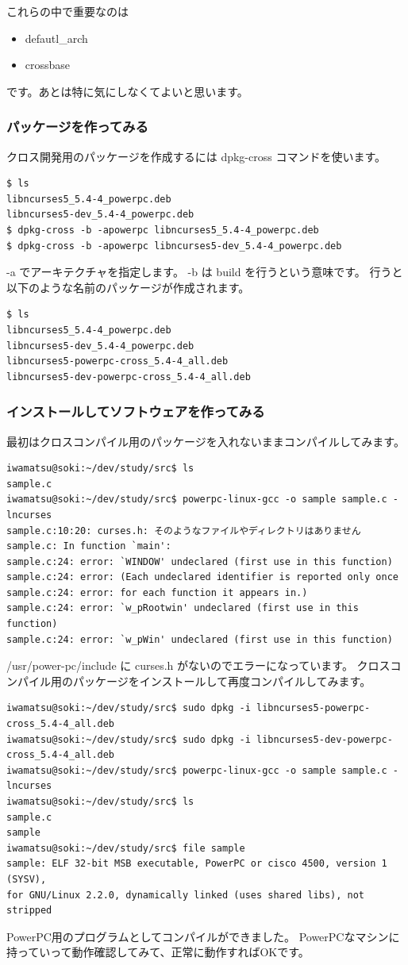 \documentclass[mingoth,a4paper]{jsarticle}
\begin{document}
これらの中で重要なのは
\begin{itemize}
 \item defautl\_arch
 \item crossbase
\end{itemize}
です。あとは特に気にしなくてよいと思います。

\subsubsection{パッケージを作ってみる}
クロス開発用のパッケージを作成するには dpkg-cross コマンドを使います。

\begin{verbatim}
$ ls 
libncurses5_5.4-4_powerpc.deb
libncurses5-dev_5.4-4_powerpc.deb
$ dpkg-cross -b -apowerpc libncurses5_5.4-4_powerpc.deb
$ dpkg-cross -b -apowerpc libncurses5-dev_5.4-4_powerpc.deb
\end{verbatim}
-a でアーキテクチャを指定します。
-b は build を行うという意味です。
行うと以下のような名前のパッケージが作成されます。
\begin{verbatim}
$ ls
libncurses5_5.4-4_powerpc.deb
libncurses5-dev_5.4-4_powerpc.deb
libncurses5-powerpc-cross_5.4-4_all.deb
libncurses5-dev-powerpc-cross_5.4-4_all.deb
\end{verbatim}

\subsubsection{インストールしてソフトウェアを作ってみる}

最初はクロスコンパイル用のパッケージを入れないままコンパイルしてみます。
\begin{verbatim}
iwamatsu@soki:~/dev/study/src$ ls
sample.c
iwamatsu@soki:~/dev/study/src$ powerpc-linux-gcc -o sample sample.c -lncurses
sample.c:10:20: curses.h: そのようなファイルやディレクトリはありません
sample.c: In function `main':
sample.c:24: error: `WINDOW' undeclared (first use in this function)
sample.c:24: error: (Each undeclared identifier is reported only once
sample.c:24: error: for each function it appears in.)
sample.c:24: error: `w_pRootwin' undeclared (first use in this function)
sample.c:24: error: `w_pWin' undeclared (first use in this function)
\end{verbatim}

/usr/power-pc/include に curses.h がないのでエラーになっています。
クロスコンパイル用のパッケージをインストールして再度コンパイルしてみます。
\begin{verbatim}
iwamatsu@soki:~/dev/study/src$ sudo dpkg -i libncurses5-powerpc-cross_5.4-4_all.deb
iwamatsu@soki:~/dev/study/src$ sudo dpkg -i libncurses5-dev-powerpc-cross_5.4-4_all.deb
iwamatsu@soki:~/dev/study/src$ powerpc-linux-gcc -o sample sample.c -lncurses
iwamatsu@soki:~/dev/study/src$ ls
sample.c
sample
iwamatsu@soki:~/dev/study/src$ file sample
sample: ELF 32-bit MSB executable, PowerPC or cisco 4500, version 1 (SYSV), 
for GNU/Linux 2.2.0, dynamically linked (uses shared libs), not stripped
\end{verbatim}
PowerPC用のプログラムとしてコンパイルができました。
PowerPCなマシンに持っていって動作確認してみて、正常に動作すればOKです。
\end{document}
